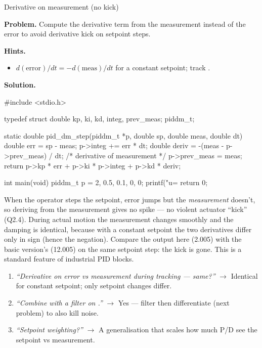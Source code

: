 \begin{gymproblem}{Derivative on measurement (no kick)}

\textbf{Problem.} Compute the derivative term from the measurement instead of
the error to avoid derivative kick on setpoint steps.

\textbf{Hints.}
\begin{itemize}
\item $d(\text{error})/dt = -d(\text{meas})/dt$ for a constant setpoint; track
  .
\end{itemize}

\attempt

\textbf{Solution.}
\begin{cgym}
#include <stdio.h>

typedef struct { double kp, ki, kd, integ, prev_meas; } piddm_t;

static double pid_dm_step(piddm_t *p, double sp, double meas, double dt) {
    double err   = sp - meas;
    p->integ    += err * dt;
    double deriv = -(meas - p->prev_meas) / dt;   /* derivative of measurement */
    p->prev_meas = meas;
    return p->kp * err + p->ki * p->integ + p->kd * deriv;
}

int main(void) {
    piddm_t p = {2, 0.5, 0.1, 0, 0};
    printf("u=%
    return 0;
}
\end{cgym}

When the operator steps the setpoint, error jumps but the \emph{measurement}
doesn't, so deriving from the measurement gives no spike --- no violent actuator
``kick'' (Q2.4). During actual motion the measurement changes smoothly and the
damping is identical, because with a constant setpoint the two derivatives differ
only in sign (hence the negation). Compare the output here (2.005) with the
basic version's (12.005) on the same setpoint step: the kick is gone. This is a
standard feature of industrial PID blocks.

\followups
\begin{enumerate}
\item \emph{``Derivative on error vs measurement during tracking --- same?''}
  $\rightarrow$ Identical for constant setpoint; only setpoint changes differ.
\item \emph{``Combine with a filter on .''} $\rightarrow$ Yes ---
  filter then differentiate (next problem) to also kill noise.
\item \emph{``Setpoint weighting?''} $\rightarrow$ A generalisation that scales
  how much P/D see the setpoint vs measurement.
\end{enumerate}
\end{gymproblem}

